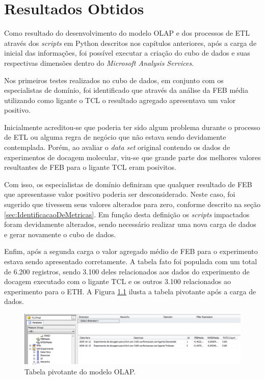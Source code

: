 \chapter{Resultados Obtidos}
\label{cap:ResultadosObtidos}

Como resultado do desenvolvimento do modelo OLAP e dos processos de ETL através dos \emph{scripts} em Python descritos nos capítulos anteriores, após a carga de inicial das informações, foi possível executar a criação do cubo de dados e suas respectivas dimensões dentro do \emph{Microsoft Analysis Services}. 

Nos primeiros testes realizados no cubo de dados, em conjunto com os especialistas de domínio, foi identificado que através da análise da FEB média utilizando como ligante o TCL o resultado agregado apresentava um valor positivo. 

Inicialmente acreditou-se que poderia ter sido algum problema durante o processo de ETL ou alguma regra de negócio que não estava sendo devidamente contemplada. Porém, ao avaliar o \emph{data set} original contendo os dados de experimentos de docagem molecular, viu-se que grande parte dos melhores valores resultantes de FEB para o ligante TCL eram posivitos.

Com isso, os especialistas de domínio definiram que qualquer resultado de FEB que apresentasse valor positivo poderia ser desconsiderado. Neste caso, foi sugerido que tivessem seus valores alterados para zero, conforme descrito na seção \ref{sec:IdentificacaoDeMetricas}. Em função desta definição os \emph{scripts} impactados foram devidamente alterados, sendo necessário realizar uma nova carga de dados e gerar novamente o cubo de dados. 

Enfim, após a segunda carga o valor agregado médio de FEB para o experimento estava sendo apresentado corretamente. A tabela fato foi populada com um total de 6.200 registros, sendo 3.100 deles relacionados aos dados do experimento de docagem executado com o ligante TCL e os outros 3.100 relacionados ao experimento para o ETH. A Figura \ref{fig:TabPivotante} ilusta a tabela pivotante após a carga de dados.

\begin{figure}[h]
        \center
        \includegraphics[scale=0.45]{images/TabelaPivotante.PNG}
        \caption{Tabela pivotante do modelo OLAP.}
        \label{fig:TabPivotante}
\end{figure}

